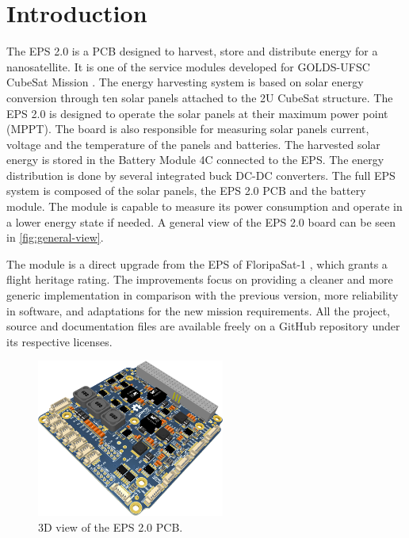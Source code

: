 %
%
%
%
%

%
%
%
%
%
%

\chapter{Introduction} \label{ch:introduction}

The EPS 2.0 is a PCB designed to harvest, store and distribute energy for a nanosatellite. It is one of the service modules developed for GOLDS-UFSC CubeSat Mission \cite{golds-ufsc-doc}. The energy harvesting system is based on solar energy conversion through ten solar panels attached to the 2U CubeSat structure. The EPS 2.0 is designed to operate the solar panels at their maximum power point (MPPT). The board is also responsible for measuring solar panels current, voltage and the temperature of the panels and batteries. The harvested solar energy is stored in the Battery Module 4C \cite{bat4c} connected to the EPS. The energy distribution is done by several integrated buck DC-DC converters. The full EPS system is composed of the solar panels, the EPS 2.0 PCB and the battery module. The module is capable to measure its power consumption and operate in a lower energy state if needed. A general view of the EPS 2.0 board can be seen in \autoref{fig:general-view}.

The module is a direct upgrade from the EPS of FloripaSat-1 \cite{eps-fsat}, which grants a flight heritage rating. The improvements focus on providing a cleaner and more generic implementation in comparison with the previous version, more reliability in software, and adaptations for the new mission requirements. All the project, source and documentation files are available freely on a GitHub repository \cite{eps2} under its respective licenses.

\begin{figure}[!ht]
    \begin{center}
        \includegraphics[width=0.55\textwidth]{figures/eps2-pcb-3d}
        \caption{3D view of the EPS 2.0 PCB.}
        \label{fig:general-view}
    \end{center}
\end{figure}